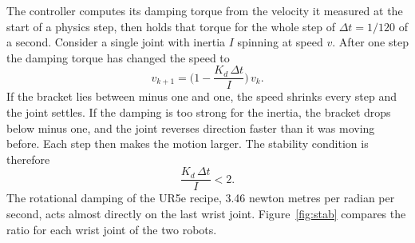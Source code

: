 The controller computes its damping torque from the velocity it measured at the start of a physics step, then holds that torque for the whole step of $\Delta t = 1/120$ of a second. Consider a single joint with inertia $I$ spinning at speed $v$. After one step the damping torque has changed the speed to
\begin{equation}
v_{k+1} = \Big(1 - \frac{K_d\,\Delta t}{I}\Big)\, v_k .
\end{equation}
If the bracket lies between minus one and one, the speed shrinks every step and the joint settles. If the damping is too strong for the inertia, the bracket drops below minus one, and the joint reverses direction faster than it was moving before. Each step then makes the motion larger. The stability condition is therefore
\begin{equation}
\frac{K_d\,\Delta t}{I} < 2 .
\end{equation}
The rotational damping of the UR5e recipe, 3.46 newton metres per radian per second, acts almost directly on the last wrist joint. Figure~\ref{fig:stab} compares the ratio for each wrist joint of the two robots.

